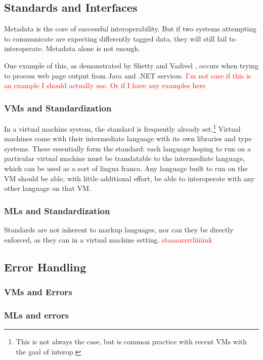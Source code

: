 \documentclass{sig-alternate}
\newcommand{\mycomment}[1]{\textcolor{red}{#1}}
\begin{document}
\subsection*{Standards and Interfaces} \cite{Shetty:2009}
Metadata is the core of successful interoperability. But if two systems attempting to communicate are expecting differently tagged data, they will still fail to interoperate. Metadata alone is not enough.

One example of this, as demonstrated by Shetty and Vadivel \cite{Shetty:2009}, occurs when trying to process web page output from Java and .NET services. \mycomment{I'm not sure if this is an example I should actually use. Or if I have any examples here}

\subsubsection*{VMs and Standardization}
In a virtual machine system, the standard is frequently already set.\footnote{This is not always the case, but is common practice with recent VMs with the goal of interop.} Virtual machines come with their intermediate language with its own libraries and type systems. These essentially form the standard: each language hoping to run on a particular virtual machine must be translatable to the intermediate language, which can be used as a sort of lingua franca. Any language built to run on the VM should be able, with little additional effort, be able to interoperate with any other language on that VM.


\subsubsection*{MLs and Standardization}
Standards are not inherent to markup languages, nor can they be directly enforced, as they can in a virtual machine setting. \mycomment{staaaarrrrliiiiink}



\subsection*{Error Handling}

\subsubsection*{VMs and Errors}

\subsubsection*{MLs and errors}
\end{document}
